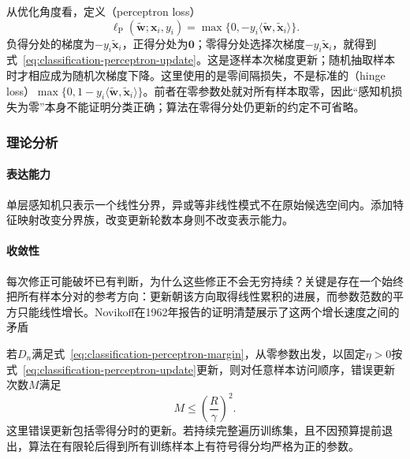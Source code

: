 从优化角度看，定义（perceptron loss）
\begin{equation}
  \label{eq:classification-perceptron-loss}
  \ell_{\mathrm{P}}(\tilde{\bm{w}};\bm{x}_i,y_i)
    =\max\{0,-y_i\langle\tilde{\bm{w}},\tilde{\bm{x}}_i\rangle\}.
\end{equation}
负得分处的梯度为$-y_i\tilde{\bm{x}}_i$，正得分处为$\bm{0}$；零得分处选择次梯度$-y_i\tilde{\bm{x}}_i$，就得到式~\eqref{eq:classification-perceptron-update}。这是逐样本次梯度更新；随机抽取样本时才相应成为随机次梯度下降。这里使用的是零间隔损失，不是标准的（hinge loss）$\max\{0,1-y_i\langle\tilde{\bm{w}},\tilde{\bm{x}}_i\rangle\}$。前者在零参数处就对所有样本取零，因此“感知机损失为零”本身不能证明分类正确；算法在零得分处仍更新的约定不可省略。

\subsubsection{理论分析}
\label{sec:classification-perceptron-analysis}

\paragraph{表达能力}
单层感知机只表示一个线性分界，异或等非线性模式不在原始候选空间内。添加特征映射改变分界族，改变更新轮数本身则不改变表示能力。

\paragraph{收敛性}
每次修正可能破坏已有判断，为什么这些修正不会无穷持续？关键是存在一个始终把所有样本分对的参考方向：更新朝该方向取得线性累积的进展，而参数范数的平方只能线性增长。Novikoff在1962年报告的证明清楚展示了这两个增长速度之间的矛盾

\begin{theorem}[感知机的错误更新界]
  \label{thm:classification-perceptron-mistakes}
  若$D_n$满足式~\eqref{eq:classification-perceptron-margin}，从零参数出发，以固定$\eta>0$按式~\eqref{eq:classification-perceptron-update}更新，则对任意样本访问顺序，错误更新次数$M$满足
  \[
    M\leq\left(\frac R\gamma\right)^2 .
  \]
  这里错误更新包括零得分时的更新。若持续完整遍历训练集，且不因预算提前退出，算法在有限轮后得到所有训练样本上有符号得分均严格为正的参数。
\end{theorem}

